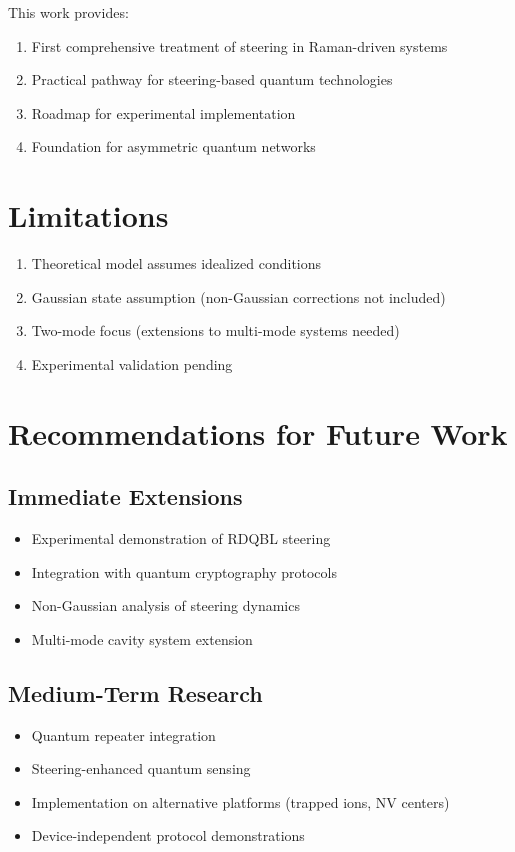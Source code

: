 This work provides:
\begin{enumerate}
	\item First comprehensive treatment of steering in Raman-driven systems
	\item Practical pathway for steering-based quantum technologies
	\item Roadmap for experimental implementation
	\item Foundation for asymmetric quantum networks
\end{enumerate}

\section{Limitations}

\begin{enumerate}
	\item Theoretical model assumes idealized conditions
	\item Gaussian state assumption (non-Gaussian corrections not included)
	\item Two-mode focus (extensions to multi-mode systems needed)
	\item Experimental validation pending
\end{enumerate}

\section{Recommendations for Future Work}

\subsection{Immediate Extensions}

\begin{itemize}
	\item Experimental demonstration of RDQBL steering
	\item Integration with quantum cryptography protocols
	\item Non-Gaussian analysis of steering dynamics
	\item Multi-mode cavity system extension
\end{itemize}

\subsection{Medium-Term Research}

\begin{itemize}
	\item Quantum repeater integration
	\item Steering-enhanced quantum sensing
	\item Implementation on alternative platforms (trapped ions, NV centers)
	\item Device-independent protocol demonstrations
\end{itemize}

